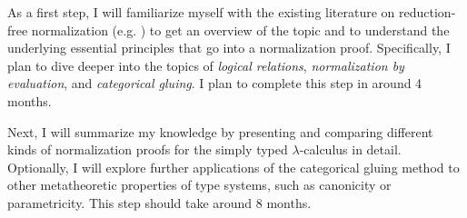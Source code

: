 \documentclass{article}
\begin{document}
As a first step, I will familiarize myself with the existing literature on reduction-free normalization (e.g. \cite{DBLP:conf/lics/BergerS91, altenkirch:1995:ctcs, cubric:1998:mscs, fiore:2002:ppdp, sterling:2018:arxiv}) to get an overview of the topic and to understand the underlying essential principles that go into a normalization proof. Specifically, I plan to dive deeper into the topics of \textit{logical relations}, \textit{normalization by evaluation}, and \textit{categorical gluing}. I plan to complete this step in around 4 months.

Next, I will summarize my knowledge by presenting and comparing different kinds of normalization proofs for the simply typed $\lambda$-calculus in detail. Optionally, I will explore further applications of the categorical gluing method to other metatheoretic properties of type systems, such as canonicity or parametricity. This step should take around 8 months.



\end{document}
